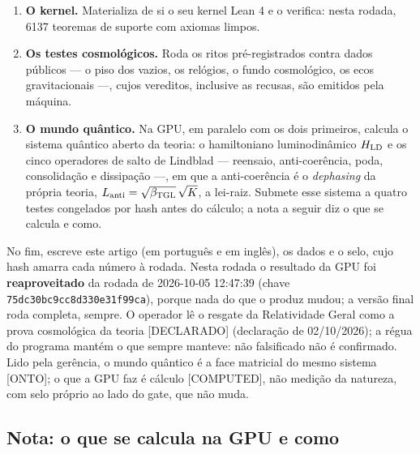 \documentclass[11pt]{article}
\newcommand{\bTGL}{\beta_{\mathrm{TGL}}}\newcommand{\Msun}{M_{\odot}}\newcommand{\TGL}{\mathrm{TGL}}
\theoremstyle{definition}\newtheorem{deriv}{Derivação}
\begin{document}
\begin{enumerate}

\item \textbf{O kernel.} Materializa de si o seu kernel Lean 4 e o verifica: nesta rodada, 6137 teoremas de suporte com axiomas limpos.

\item \textbf{Os testes cosmológicos.} Roda os ritos pré-registrados contra dados públicos --- o piso dos vazios, os relógios, o fundo cosmológico, os ecos gravitacionais ---, cujos vereditos, inclusive as recusas, são emitidos pela máquina.

\item \textbf{O mundo quântico.} Na GPU, em paralelo com os dois primeiros, calcula o sistema quântico aberto da teoria: o hamiltoniano luminodinâmico $H_{\rm LD}$ e os cinco operadores de salto de Lindblad --- reensaio, anti-coerência, poda, consolidação e dissipação ---, em que a anti-coerência é o \emph{dephasing} da própria teoria, $L_{\rm anti}=\sqrt{\bTGL}\,\sqrt K$, a lei-raiz. Submete esse sistema a quatro testes congelados por hash antes do cálculo; a nota a seguir diz o que se calcula e como.

\end{enumerate}

No fim, escreve este artigo (em português e em inglês), os dados e o selo, cujo hash amarra cada número à rodada. Nesta rodada o resultado da GPU foi \textbf{reaproveitado} da rodada de 2026-10-05 12:47:39 (chave \texttt{75dc30bc9cc8d330e31f99ca}), porque nada do que o produz mudou; a versão final roda completa, sempre. O operador lê o resgate da Relatividade Geral como a prova cosmológica da teoria \textsf{[DECLARADO]} (declaração de 02/10/2026); a régua do programa mantém o que sempre manteve: não falsificado não é confirmado. Lido pela gerência, o mundo quântico é a face matricial do mesmo sistema \textsf{[ONTO]}; o que a GPU faz é cálculo \textsf{[COMPUTED]}, não medição da natureza, com selo próprio ao lado do gate, que não muda.

\subsection*{Nota: o que se calcula na GPU e como}

\end{document}

